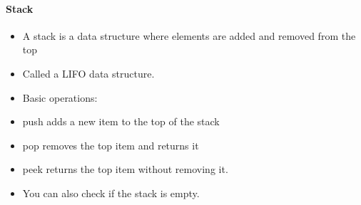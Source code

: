 \documentclass[10pt,a4paper]{article}
\begin{document}
\paragraph{Stack}
\begin{itemize}
\item A stack is a data structure where elements are added and removed from the top
\item Called a LIFO data structure.
\item Basic operations:
\item push adds a new item to the top of the stack
\item pop removes the top item and returns it
\item peek returns the top item without removing it.
\item You can also check if the stack is empty.
\end{itemize}
\end{document}
